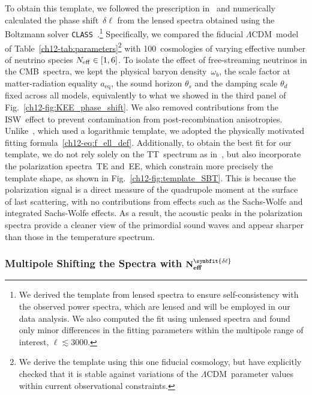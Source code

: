 To obtain this template, we followed the prescription in~\cite{Follin:2015hya} and numerically calculated the phase shift~$\delta\ell$ from the lensed spectra obtained using the Boltzmann solver \texttt{CLASS}~\cite{Blas:2011rf}.\footnote{We derived the template from lensed spectra to ensure self-consistency with the observed power spectra, which are lensed and will be employed in our data analysis. We also computed the fit using unlensed spectra and found only minor differences in the fitting parameters within the multipole range of interest, $\ell \lesssim 3000$.} Specifically, we compared the fiducial $\Lambda$CDM~model of Table~\ref{ch12-tab:parameters}\hskip1pt\footnote{We derive the template using this one fiducial cosmology, but have explicitly checked that it is stable against variations of the $\Lambda$CDM~parameter values within current observational constraints.} with 100~cosmologies of varying effective number of neutrino species $N_\mathrm{eff} \in [1,6]$. To isolate the effect of free-streaming neutrinos in the CMB~spectra, we kept the physical baryon density~$\omega_b$, the scale factor at matter-radiation equality $a_\mathrm{eq}$, the sound horizon $\theta_s$ and the damping scale $\theta_d$ fixed across all models, equivalently to what we showed in the third panel of Fig.~\ref{ch12-fig:KEE_phase_shift}. We also removed contributions from the ISW~effect to prevent contamination from post-recombination anisotropies. Unlike~\cite{Follin:2015hya}, which used a logarithmic template, we adopted the physically motivated fitting formula~\eqref{ch12-eq:f_ell_def}. Additionally, to obtain the best fit for our template, we do not rely solely on the TT~spectrum as in~\cite{Follin:2015hya}, but also incorporate the polarization spectra~TE and~EE, which constrain more precisely the template shape, as shown in Fig.~\ref{ch12-fig:template_SBT}. This is because the polarization signal is a direct measure of the quadrupole moment at the surface of last scattering, with no contributions from effects such as the Sachs-Wolfe and integrated Sachs-Wolfe effects. As a result, the acoustic peaks in the polarization spectra provide a cleaner view of the primordial sound waves and appear sharper than those in the temperature spectrum.


\subsubsection[Multipole Shifting the Spectra with Neff]{Multipole Shifting the Spectra with $\mathbf{N}_\mathbf{eff}^{\symbfit{\delta\ell}}$}
\label{ch12-sec:spectrum-method}

